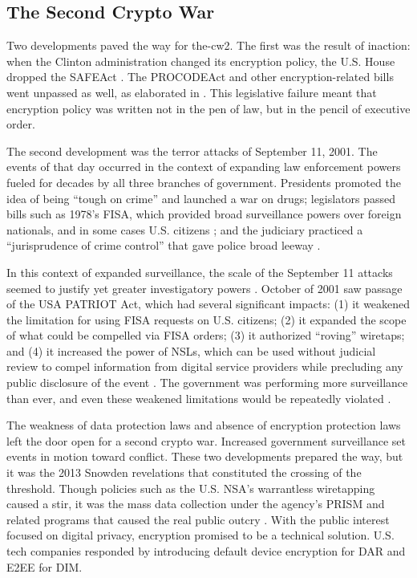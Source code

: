 \subsection{The Second Crypto War}
\label{sec-history-cw2}

Two developments paved the way for \ac{the-cw2}. The first was the result of inaction: when the Clinton administration
changed its encryption policy, the U.S. House dropped the \ac{SAFEAct} \cite{goodlatte_hr3011_1996}. The \ac{PROCODEAct}
and other encryption-related bills went unpassed as well, as elaborated in . This legislative
failure meant that encryption policy was written not in the pen of law, but in the pencil of executive order.

The second development was the terror attacks of September 11, 2001. The events of that day occurred in the context of
expanding law enforcement powers fueled for decades by all three branches of government. Presidents promoted the idea of
being ``tough on crime'' and launched a war on drugs; legislators passed bills such as 1978's \ac{FISA}, which provided
broad surveillance powers over foreign nationals, and in some cases U.S. citizens \cite{rodino_1978}; and the judiciary
practiced a ``jurisprudence of crime control'' that gave police broad leeway \cite{gizzi_fourth_2016}.

In this context of expanded surveillance, the scale of the September 11 attacks seemed to justify yet greater
investigatory powers \cite{bloss_escalating_2007}. October of 2001 saw passage of the USA PATRIOT Act, which had several
significant impacts: (1) it weakened the limitation for using \ac{FISA} requests on U.S. citizens; (2) it expanded the
scope of what could be compelled via \ac{FISA} orders; (3) it authorized ``roving'' wiretaps; and (4) it increased the
power of \acp{NSL}, which can be used without judicial review to compel information from digital service providers while
precluding any public disclosure of the event \cite{sensenbrenner_2001} \cite{shamsi_2011}. The government was
performing more surveillance than ever, and even these weakened limitations would be repeatedly violated
\cite{shamsi_2011} \cite{tucker_2020}.

The weakness of data protection laws and absence of encryption protection laws left the door open for a second crypto
war. Increased government surveillance set events in motion toward conflict. These two developments prepared the way,
but it was the 2013 Snowden revelations that constituted the crossing of the threshold. Though policies such as the U.S.
\ac{NSA}'s warrantless wiretapping caused a stir, it was the mass data collection under the agency's \ac{PRISM} and
related programs that caused the real public outcry \cite{landau_making_2013}. With the public interest focused on
digital privacy, encryption promised to be a technical solution. U.S. tech companies responded by introducing default
device encryption for \acl{DAR} and \acl{E2EE} for \acl{DIM}.

